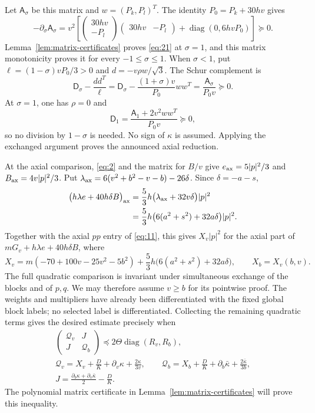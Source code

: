 Let $\mathsf A_\sigma$ be this matrix and $w=(P_k,P_l)^T$.
The identity $P_0=P_k+30hv$ gives
\[
 -\partial_\sigma\mathsf A_\sigma
 =v^2\left[
       \begin{pmatrix}30hv\\-P_l\end{pmatrix}
       \begin{pmatrix}30hv&-P_l\end{pmatrix}
       +\operatorname{diag}(0,6hvP_0)\right]\succeq0.
\]
Lemma~\ref{lem:matrix-certificates} proves \eqref{eq:21} at
$\sigma=1$, and this matrix monotonicity proves it for every
$-1\le\sigma\le1$. When $\sigma<1$, put
$\ell=(1-\sigma)vP_0/3>0$ and $d=-v\rho w/\sqrt3$.
The Schur complement is
\[
 \mathsf D_\sigma-\frac{dd^T}{\ell}
 =\mathsf D_\sigma-\frac{(1+\sigma)v}{P_0}ww^T
 =\frac{\mathsf A_\sigma}{P_0v}\succeq0.
\]
At $\sigma=1$, one has $\rho=0$ and
\[
 \mathsf D_1=\frac{\mathsf A_1+2v^2ww^T}{P_0v}\succeq0,
\]
so no division by $1-\sigma$ is needed. No sign of $\kappa$ is assumed.
Applying the exchanged argument proves the announced axial reduction.

At the axial comparison, \eqref{eq:2} and the matrix for $B/v$ give
$e_{\rm ax}=5|p|^2/3$ and $B_{\rm ax}=4v|p|^2/3$. Put
$\lambda_{\rm ax}=6(v^2+b^2-v-b)-26\delta$. Since $\delta=-a-s$,
\[
\begin{aligned}
\bigl(h\lambda e+40h\delta B\bigr)_{\rm ax}
 &=\frac53h\bigl(\lambda_{\rm ax}+32v\delta\bigr)|p|^2\\
 &=\frac53h\bigl(6(a^2+s^2)+32a\delta\bigr)|p|^2.
\end{aligned}
\]
Together with the axial $pp$ entry of \eqref{eq:11}, this gives
$X_v|p|^2$ for the axial part of $mG_v+h\lambda e+40h\delta B$, where
\[
 X_v=m(-70+100v-25v^2-5b^2)
       +\frac53h\bigl(6(a^2+s^2)+32a\delta\bigr),
 \qquad X_b=X_v(b,v).
\]
The full quadratic comparison is invariant under simultaneous exchange
of the blocks and of $p,q$. We may therefore assume $v\ge b$ for its
pointwise proof. The weights and multipliers have already been
differentiated with the fixed global block labels; no selected label is
differentiated. Collecting the remaining quadratic terms gives the
desired estimate precisely when
\begin{equation}
\begin{gathered}
 \begin{pmatrix}\mathcal Q_v&J\\J&\mathcal Q_b\end{pmatrix}
       \preceq2\Theta\operatorname{diag}(R_v,R_b),\\
 \mathcal Q_v=X_v+\frac DK+\partial_v\kappa+\frac{2\kappa}{3v},
 \qquad
 \mathcal Q_b=X_b+\frac DK+\partial_b\bar\kappa
                                      +\frac{2\bar\kappa}{3b},\\
 J=\frac{\partial_b\kappa+\partial_v\bar\kappa}{2}-\frac DK.
\end{gathered}
\tag{22}\label{eq:22}
\end{equation}
The polynomial matrix certificate in Lemma~\ref{lem:matrix-certificates}
will prove this inequality.

